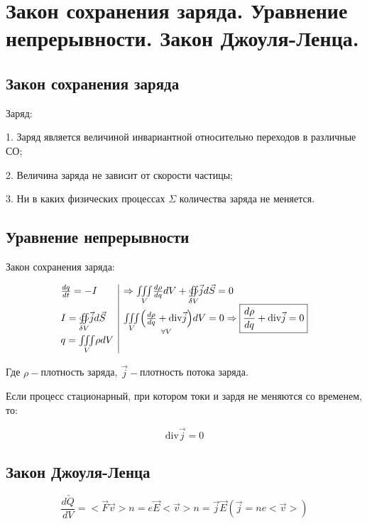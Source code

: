 


\newpage
\section{Закон сохранения заряда. Уравнение непрерывности. Закон Джоуля-Ленца.}
 
\subsection*{Закон сохранения заряда}

Заряд:

1. Заряд является величиной инвариантной относительно переходов в различные СО;

2. Величина заряда не зависит от скорости частицы;

3. Ни в каких физических процессах $\Sigma$ количества заряда не меняется. 

\subsection*{Уравнение непрерывности}

Закон сохранения заряда:

\[\begin{array}{l|l}
    \frac{dq}{dt}=-I & \Rightarrow \underset{V}{\iiint} \frac{d\rho}{dq}dV +\underset{\delta V}{\oiint} \vec{j}d\vec{S}=0  \\
    I=\underset{\delta V}{\oiint} \vec{j}d\vec{S} & \underset{V}{\iiint}\underset{\forall V }{\left( \frac{d\rho}{dq}+\mm{div} \vec{j}  \right)}dV=0 \Rightarrow \boxed{\frac{d\rho}{dq}+\mm{div} \vec{j}=0 } \\
    q=\underset{V}{\iiint}\rho dV 
\end{array}\]

Где $\rho-$плотность заряда, $\vec{j}-$плотность потока заряда.

Если процесс стационарный, при котором токи и зардя не меняются со временем, то:

\[\mathrm{div}\vec{j} =0\]

\subsection*{Закон Джоуля-Ленца}

\[\frac{d\check{Q}}{dV} =<\vec{F}\vec{v}>n=e\vec{E}<\vec{v}>n=\vec{j}\vec{E}(\vec{j}=ne<\vec{v}>)\]

